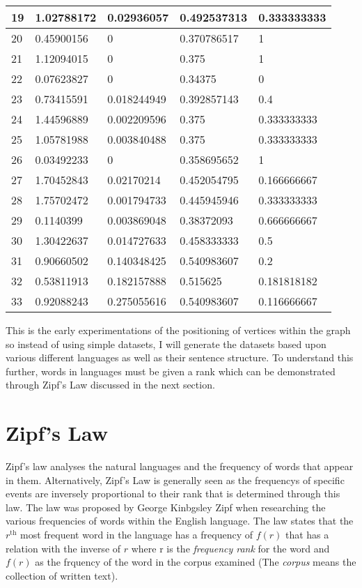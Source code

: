 \begin{table}[H]
\begin{tabular}{|l|l|l|l|l|}
        19 & 1.02788172 & 0.02936057 & 0.492537313 & 0.333333333 \\ \hline
        20 & 0.45900156 & 0 & 0.370786517 & 1 \\ \hline
        21 & 1.12094015 & 0 & 0.375 & 1 \\ \hline
        22 & 0.07623827 & 0 & 0.34375 & 0 \\ \hline
        23 & 0.73415591 & 0.018244949 & 0.392857143 & 0.4 \\ \hline
        24 & 1.44596889 & 0.002209596 & 0.375 & 0.333333333 \\ \hline
        25 & 1.05781988 & 0.003840488 & 0.375 & 0.333333333 \\ \hline
        26 & 0.03492233 & 0 & 0.358695652 & 1 \\ \hline
        27 & 1.70452843 & 0.02170214 & 0.452054795 & 0.166666667 \\ \hline
        28 & 1.75702472 & 0.001794733 & 0.445945946 & 0.333333333 \\ \hline
        29 & 0.1140399 & 0.003869048 & 0.38372093 & 0.666666667 \\ \hline
        30 & 1.30422637 & 0.014727633 & 0.458333333 & 0.5 \\ \hline
        31 & 0.90660502 & 0.140348425 & 0.540983607 & 0.2 \\ \hline
        32 & 0.53811913 & 0.182157888 & 0.515625 & 0.181818182 \\ \hline
        33 & 0.92088243 & 0.275055616 & 0.540983607 & 0.116666667 \\ \hline
    \end{tabular}
    \label{KarateTable}
\end{table}

This is the early experimentations of the positioning of vertices within the graph so instead of using simple datasets, I will generate the datasets based upon various different languages as well as their sentence structure. To understand this further, words in languages must be given a rank which can be demonstrated through Zipf's Law discussed in the next section.

\section{Zipf's Law}
Zipf's law analyses the natural languages and the frequency of words that appear in them. Alternatively, Zipf's Law\cite{hosch2009zipf} is generally seen as the frequencys of specific events are inversely proportional to their rank that is determined through this law. The law was proposed by George Kinbgsley Zipf when researching the various frequencies of words within the English language. The law states that the $r^{\text{th}}$ most frequent word in the language has a frequency of $f(r)$ that has a relation with the inverse of $r$ where r is the \emph{frequency rank} for the word and $f(r)$ as the frquency of the word in the corpus examined (The \emph{corpus} means the collection of written text).

